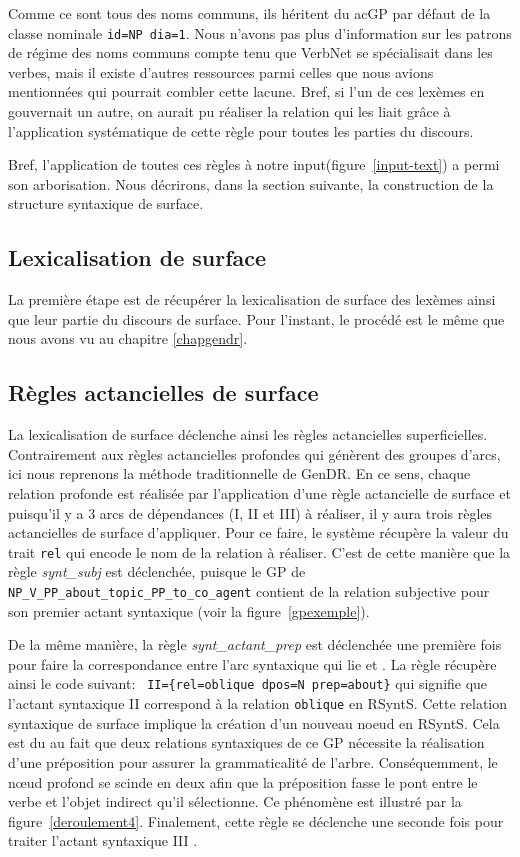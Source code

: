 Comme ce sont tous des noms communs, ils héritent du ac{GP} par défaut de la classe nominale \texttt{id=NP dia=1}. Nous n'avons pas plus d'information sur les patrons de régime des noms communs compte tenu que VerbNet se spécialisait dans les verbes, mais il existe d'autres ressources parmi celles que nous avions mentionnées qui pourrait combler cette lacune. Bref, si l'un de ces lexèmes en gouvernait un autre, on aurait pu réaliser la relation qui les liait grâce à l'application systématique de cette règle pour toutes les parties du discours.

Bref, l'application de toutes ces règles à notre input(figure~\ref{input-text}) a permi son arborisation. Nous décrirons, dans la section suivante, la construction de la structure syntaxique de surface.

\subsection{Lexicalisation de surface}
La première étape est de récupérer la lexicalisation de surface des lexèmes ainsi que leur partie du discours de surface. Pour l'instant, le procédé est le même que nous avons vu au chapitre \ref{chapgendr}.

\subsection{Règles actancielles de surface}
La lexicalisation de surface déclenche ainsi les règles actancielles superficielles. Contrairement aux règles actancielles profondes qui génèrent des groupes d'arcs, ici nous reprenons la méthode traditionnelle de GenDR. En ce sens, chaque relation profonde est réalisée par l'application d'une règle actancielle de surface et puisqu'il y a 3 arcs de dépendances (I, II et III) à réaliser, il y aura trois règles actancielles de surface d'appliquer. Pour ce faire, le système récupère la valeur du trait \texttt{rel} qui encode le nom de la relation à réaliser. C'est de cette manière que la règle \emph{synt\_subj} est déclenchée, puisque le \ac{GP} de \texttt{NP\_V\_PP\_about\_topic\_PP\_to\_co\_agent} contient de la relation subjective pour son premier actant syntaxique (voir la figure~\ref{gpexemple}).

De la même manière, la règle \emph{synt\_actant\_prep} est déclenchée une première fois pour faire la correspondance entre l'arc syntaxique qui lie  et . La règle récupère ainsi le code suivant: \lstinline! II={rel=oblique dpos=N prep=about}! qui signifie que l'actant syntaxique II correspond à la relation \texttt{oblique} en RSyntS. Cette relation syntaxique de surface implique la création d'un nouveau noeud en \ac{RSyntS}. Cela est du au fait que deux relations syntaxiques de ce \ac{GP} nécessite la réalisation d'une préposition pour assurer la grammaticalité de l'arbre. Conséquemment, le n\oe{}ud profond  se scinde en deux afin que la préposition  fasse le pont entre le verbe et l'objet indirect qu'il sélectionne. Ce phénomène est illustré par la figure~\ref{deroulement4}. Finalement, cette règle se déclenche une seconde fois pour traiter l'actant syntaxique III .

